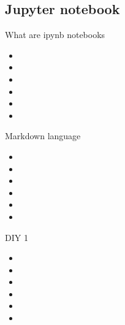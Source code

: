 \subsection[Jupyter notebook]{Jupyter notebook}
\begin{frame}{What are ipynb notebooks}
	\begin{beamerboxesrounded}{}
		\begin{itemize}
			\item
			\item 
			\item 
			\item 
			\item 
			\item 
		\end{itemize}
	\end{beamerboxesrounded}
\end{frame}

\begin{frame}{Markdown language}
	\begin{beamerboxesrounded}{}
		\begin{itemize}
			\item
			\item 
			\item 
			\item 
			\item 
			\item 
		\end{itemize}
	\end{beamerboxesrounded}
\end{frame}

\begin{frame}{DIY 1}
	\begin{beamerboxesrounded}{}
		\begin{itemize}
			\item
			\item 
			\item 
			\item 
			\item 
			\item 
		\end{itemize}
	\end{beamerboxesrounded}
\end{frame}

